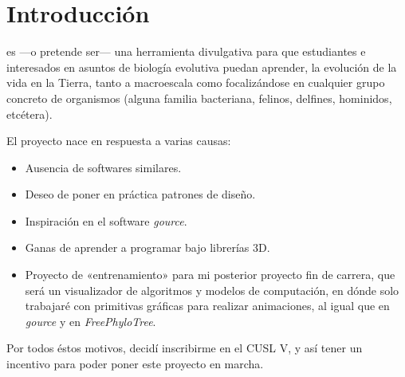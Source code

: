 

\section{Introducción}
\label{sec:introduccion}

\fpt es \----o pretende ser\---- una herramienta
divulgativa para que estudiantes e interesados en asuntos de biología
evolutiva puedan aprender, la evolución de la vida en la Tierra, tanto
a macroescala como focalizándose en cualquier grupo concreto de organismos
(alguna familia bacteriana, felinos, delfines, hominidos, etcétera).

El proyecto nace en respuesta a varias causas:
\begin{itemize}
\item Ausencia de softwares similares.
\item Deseo de poner en práctica patrones de diseño.
\item Inspiración en el software \textit{gource}.
\item Ganas de aprender a programar bajo librerías 3D.
\item Proyecto de «entrenamiento» para mi posterior proyecto fin de
  carrera, que será un visualizador de algoritmos y modelos de
  computación, en dónde solo trabajaré con primitivas gráficas para
  realizar animaciones, al igual que en \textit{gource} y en
  \textit{FreePhyloTree}.
\end{itemize}

Por todos éstos motivos, decidí inscribirme en el CUSL V, y así tener
un incentivo para poder poner este proyecto en marcha.


